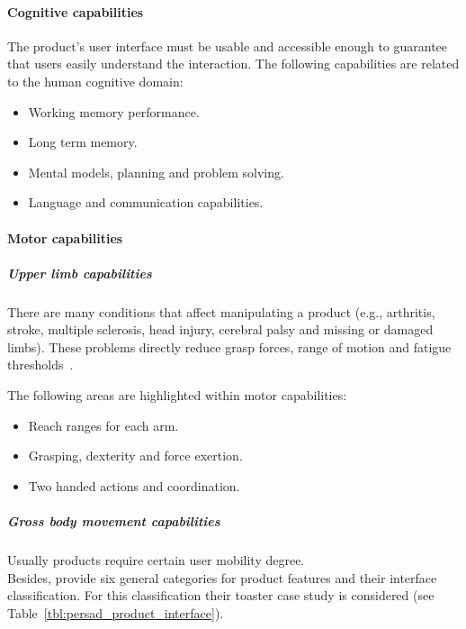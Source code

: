 
\paragraph*{Cognitive capabilities}
The product's user interface must be usable and accessible enough to guarantee 
that users easily understand the interaction. The following capabilities are 
related to the human cognitive domain:

\begin{itemize}
 \item Working memory performance.
 \item Long term memory.
 \item Mental models, planning and problem solving.
 \item Language and communication capabilities.
\end{itemize}

\paragraph*{Motor capabilities}
\subparagraph*{Upper limb capabilities}
There are many conditions that affect manipulating a product (e.g., arthritis, 
stroke, multiple sclerosis, head injury, cerebral palsy and missing or damaged 
limbs). These problems directly reduce grasp forces, range of motion and fatigue 
thresholds~\cite{persad_characterising_2007}.

The following areas are highlighted within motor capabilities:
\begin{itemize}
  \item Reach ranges for each arm.
  \item Grasping, dexterity and force exertion.
  \item Two handed actions and coordination.
\end{itemize}

\subparagraph*{Gross body movement capabilities}
Usually products require certain user mobility degree. 
\\
Besides, \citeauthor{persad_characterising_2007} provide six general categories 
for product features and their interface classification. For this classification 
their toaster case study is considered (see Table~\ref{tbl:persad_product_interface}).

